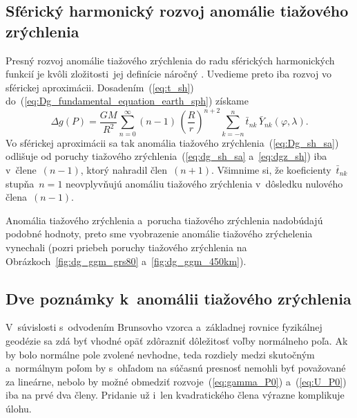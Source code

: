 \documentclass[a4paper,12pt]{book}
\begin{document}
\subsection{Sférický harmonický rozvoj anomálie tiažového zrýchlenia}

Presný rozvoj anomálie tiažového zrýchlenia do radu sférických harmonických 
funkcií je kvôli zložitosti~jej definície náročný \parencite[pozri 
napríklad][]{Barthelmes2013}.  Uvedieme preto iba rozvoj vo sférickej 
aproximácii.  Dosadením~(\ref{eq:t_sh}) 
do~(\ref{eq:Dg_fundamental_equation_earth_sph}) získame
%
\begin{equation}
\label{eq:Dg_sh_sa}
\Delta g(P) = \frac{GM}{R^2} \sum_{n = 0}^\infty (n - 1) \, \left( \frac{R}{r} 
\right)^{n + 2} \sum_{k = -n}^{n} \bar{t}_{nk} \, \bar{Y}_{nk}(\varphi, 
\lambda){.}
\end{equation}
%
Vo sférickej aproximácii sa tak anomália tiažového 
zrýchlenia~(\ref{eq:Dg_sh_sa}) odlišuje od poruchy tiažového 
zrýchlenia~(\ref{eq:dg_sh_sa} a~\ref{eq:dgz_sh}) iba v~člene~$(n - 1)$, ktorý 
nahradil člen~$(n + 1)$.  Všimnime si, že  koeficienty~$\bar{t}_{nk}$ stupňa~$n 
= 1$ neovplyvňujú anomáliu tiažového zrýchlenia v~dôsledku nulového člena~$(n 
- 1)$.

Anomália tiažového zrýchlenia a~porucha tiažového zrýchlenia nadobúdajú podobné 
hodnoty, preto sme vyobrazenie anomálie tiažového zrýchelenia vynechali (pozri 
priebeh poruchy tiažového zrýchlenia na Obrázkoch~\ref{fig:dg_ggm_grs80} 
a~\ref{fig:dg_ggm_450km}).



\subsection*{Dve poznámky k~anomálii tiažového zrýchlenia}

V~súvislosti s~odvodením Brunsovho vzorca a~základnej rovnice fyzikálnej 
geodézie sa zdá byť vhodné opäť zdôrazniť dôležitosť voľby normálneho poľa.  Ak 
by bolo normálne pole zvolené nevhodne, teda rozdiely medzi skutočným 
a~normálnym poľom by s~ohľadom na súčasnú presnosť nemohli byť považované za 
lineárne, nebolo by možné obmedziť rozvoje~(\ref{eq:gamma_P0}) 
a~(\ref{eq:U_P0}) iba na prvé dva členy.  Pridanie už i~len kvadratického člena 
výrazne komplikuje úlohu.
\end{document}
